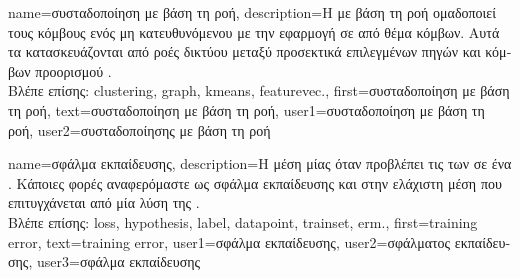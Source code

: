 {name={\foreignlanguage{greek}{συσταδοποίηση με βάση τη ροή}},
	description={\foreignlanguage{greek}{Η}  
		\foreignlanguage{greek}{με βάση τη ροή ομαδοποιεί τους κόμβους ενός μη κατευθυνόμενου}  
		 \foreignlanguage{greek}{με την εφαρμογή}   \foreignlanguage{greek}{σε}  
		 \foreignlanguage{greek}{από θέμα κόμβων. Αυτά τα}  \foreignlanguage{greek}{κατασκευάζονται 
		από ροές δικτύου μεταξύ προσεκτικά επιλεγμένων πηγών και κόμβων προορισμού} \cite{FlowSpecClustering2021}.\\
		\foreignlanguage{greek}{Βλέπε επίσης:} \gls{clustering}, \gls{graph}, \gls{kmeans}, \gls{featurevec}.}, 
	first={\foreignlanguage{greek}{συσταδοποίηση με βάση τη ροή}},
	text={\foreignlanguage{greek}{συσταδοποίηση με βάση τη ροή}},
	user1={\foreignlanguage{greek}{συσταδοποίηση με βάση τη ροή}}, %
    	user2={\foreignlanguage{greek}{συσταδοποίησης με βάση τη ροή}} %
}

{name={\foreignlanguage{greek}{σφάλμα εκπαίδευσης}},
	description={\foreignlanguage{greek}{Η μέση}  \foreignlanguage{greek}{μίας} 
		 \foreignlanguage{greek}{όταν προβλέπει τις}  \foreignlanguage{greek}{των} 
		 \foreignlanguage{greek}{σε ένα} . 
		\foreignlanguage{greek}{Κάποιες φορές αναφερόμαστε ως σφάλμα εκπαίδευσης και στην ελάχιστη μέση}  
		\foreignlanguage{greek}{που επιτυγχάνεται από μία λύση της} .\\
		\foreignlanguage{greek}{Βλέπε επίσης:} \gls{loss}, \gls{hypothesis}, \gls{label}, \gls{datapoint}, \gls{trainset}, \gls{erm}.},
	first={training error},
	text={training error},
	user1={\foreignlanguage{greek}{σφάλμα εκπαίδευσης}}, %
  	user2={\foreignlanguage{greek}{σφάλματος εκπαίδευσης}}, %
	user3={\foreignlanguage{greek}{σφάλμα εκπαί\-δευσης}} %
}

